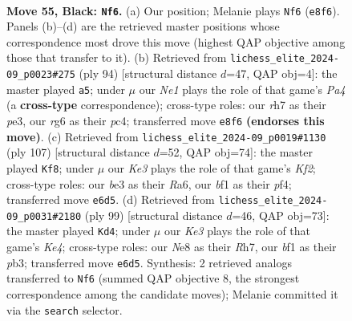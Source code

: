 \documentclass[11pt]{article}
\begin{document}
\clearpage

\begin{figure}[p]\centering
\begin{subfigure}{0.46\textwidth}\centering
\resizebox{\linewidth}{!}{%
\newchessgame
\chessboard[
  setfen={4n3/p1pr3R/4k1R1/5p2/r4P2/4B3/2K4P/5B2 b - - 15 55},
  showmover=false,
  pgfstyle=straightmove, color=movearrow, markmove={e8-f6}
]}
\caption{}
\end{subfigure}\hfill
\begin{subfigure}{0.46\textwidth}\centering
\resizebox{\linewidth}{!}{%
\newchessgame
\chessboard[
  setfen={8/1r3b2/1P3R2/4P1k1/P1pP1p2/2K1p3/8/8 w - - 0 48},
  showmover=false,
  pgfstyle=straightmove, color=movearrow, markmove={a4-a5}
]}
\caption{}
\end{subfigure}
\\[4pt]
\begin{subfigure}{0.46\textwidth}\centering
\resizebox{\linewidth}{!}{%
\newchessgame
\chessboard[
  setfen={8/5k1R/r1p3p1/P3R3/5PP1/2pr4/5K2/8 b - - 1 54},
  showmover=false,
  pgfstyle=straightmove, color=movearrow, markmove={f7-f8}
]}
\caption{}
\end{subfigure}\hfill
\begin{subfigure}{0.46\textwidth}\centering
\resizebox{\linewidth}{!}{%
\newchessgame
\chessboard[
  setfen={8/p6r/8/2R1k3/5p2/1P2p2B/P3Pr2/6K1 b - - 3 50},
  showmover=false,
  pgfstyle=straightmove, color=movearrow, markmove={e5-d4}
]}
\caption{}
\end{subfigure}
\caption{\textbf{Move 55, Black: \texttt{Nf6}.} (a) Our position; Melanie plays \texttt{Nf6} (\texttt{e8f6}). Panels (b)--(d) are the retrieved master positions whose correspondence most drove this move (highest QAP objective among those that transfer to it). (b) Retrieved from \texttt{lichess\_elite\_2024-09\_p0023\#275} (ply 94) [structural distance $d$=47, QAP obj=4]: the master played \texttt{a5}; under $\mu$ our \emph{Ne1} plays the role of that game's \emph{Pa4} (a \textbf{cross-type} correspondence); cross-type roles: our \emph{r}h7 as their \emph{p}e3, our \emph{r}g6 as their \emph{p}c4; transferred move \texttt{e8f6} \textbf{(endorses this move)}. (c) Retrieved from \texttt{lichess\_elite\_2024-09\_p0019\#1130} (ply 107) [structural distance $d$=52, QAP obj=74]: the master played \texttt{Kf8}; under $\mu$ our \emph{Ke3} plays the role of that game's \emph{Kf2}; cross-type roles: our \emph{b}e3 as their \emph{R}a6, our \emph{b}f1 as their \emph{p}f4; transferred move \texttt{e6d5}. (d) Retrieved from \texttt{lichess\_elite\_2024-09\_p0031\#2180} (ply 99) [structural distance $d$=46, QAP obj=73]: the master played \texttt{Kd4}; under $\mu$ our \emph{Ke3} plays the role of that game's \emph{Ke4}; cross-type roles: our \emph{N}e8 as their \emph{R}h7, our \emph{b}f1 as their \emph{p}b3; transferred move \texttt{e6d5}. Synthesis: 2 retrieved analogs transferred to \texttt{Nf6} (summed QAP objective 8, the strongest correspondence among the candidate moves); Melanie committed it via the \texttt{search} selector.}
\label{fig:thought-m109}
\end{figure}
\end{document}
